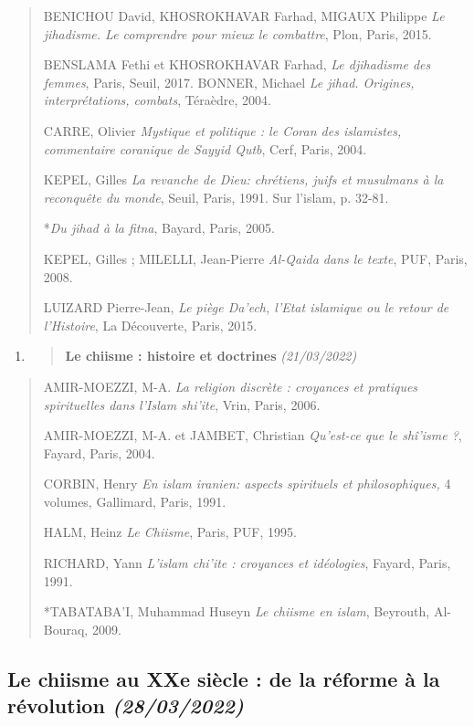 \begin{quote}
BENICHOU David, KHOSROKHAVAR Farhad, MIGAUX Philippe \emph{Le jihadisme.
Le comprendre pour mieux le combattre}, Plon, Paris, 2015.

BENSLAMA Fethi et KHOSROKHAVAR Farhad, \emph{Le djihadisme des femmes},
Paris, Seuil, 2017. BONNER, Michael \emph{Le jihad. Origines,
interprétations, combats}, Téraèdre, 2004.

CARRE, Olivier \emph{Mystique et politique : le Coran des islamistes,
commentaire coranique de Sayyid Qutb}, Cerf, Paris, 2004.

KEPEL, Gilles \emph{La revanche de Dieu: chrétiens, juifs et musulmans à
la reconquête du monde}, Seuil, Paris, 1991. Sur l'islam, p. 32-81.

*\emph{Du jihad à la fitna}, Bayard, Paris, 2005.

KEPEL, Gilles ; MILELLI, Jean-Pierre \emph{Al-Qaida dans le texte}, PUF,
Paris, 2008.

LUIZARD Pierre-Jean, \emph{Le piège Da'ech, l'Etat islamique ou le
retour de l'Histoire}, La Découverte, Paris, 2015.
\end{quote}

\begin{enumerate}
\def\labelenumi{\arabic{enumi}.}
\setcounter{enumi}{1}
\item
  \begin{quote}
  \textbf{{Le chiisme : histoire et doctrines}}
  \emph{(21/03/2022)}
  \end{quote}
\end{enumerate}

\begin{quote}
AMIR-MOEZZI, M-A. \emph{La religion discrète : croyances et pratiques
spirituelles dans l'Islam shi'ite}, Vrin, Paris, 2006.

AMIR-MOEZZI, M-A. et JAMBET, Christian \emph{Qu'est-ce que le shî'isme
?}, Fayard, Paris, 2004.

CORBIN, Henry \emph{En islam iranien: aspects spirituels et
philosophiques,} 4 volumes, Gallimard, Paris, 1991.

HALM, Heinz \emph{Le Chiisme}, Paris, PUF, 1995.

RICHARD, Yann \emph{L'islam chi'ite : croyances et idéologies}, Fayard,
Paris, 1991.

*TABATABA'I, Muhammad Huseyn \emph{Le chiisme en islam}, Beyrouth,
Al-Bouraq, 2009.
\end{quote}

\hypertarget{le-chiisme-au-xxe-siuxe8cle-de-la-ruxe9forme-uxe0-la-ruxe9volution-28032022}{%
\subsection{\texorpdfstring{{Le chiisme au XXe siècle : de la
réforme à la révolution}
\emph{(28/03/2022)}}{Le chiisme au XXe siècle : de la réforme à la révolution (28/03/2022)}}\label{le-chiisme-au-xxe-siuxe8cle-de-la-ruxe9forme-uxe0-la-ruxe9volution-28032022}}


